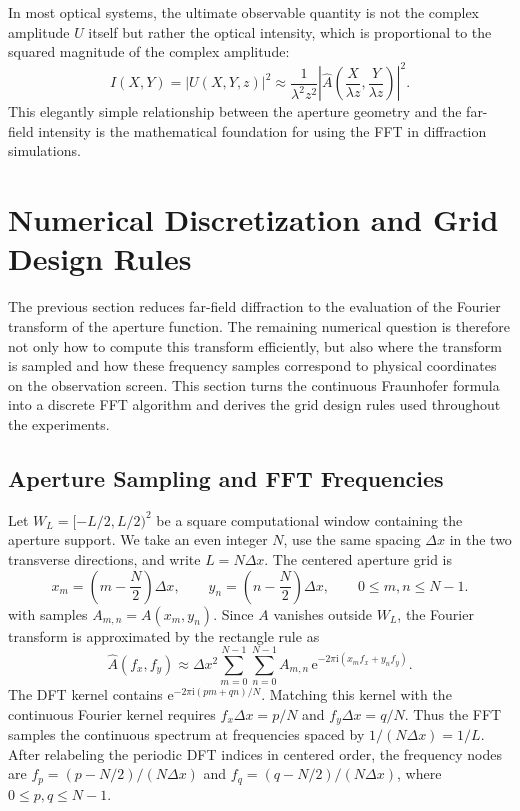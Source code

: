 \documentclass[12pt]{article}
\begin{document}
In most optical systems, the ultimate observable quantity is not the complex amplitude \( U \) itself but
rather the optical intensity, which is proportional to the squared magnitude of the complex amplitude:
\[
    I(X, Y) = |U(X, Y, z)|^2 \approx \frac{1}{\lambda^2 z^2} \left| \hat{A} \left( \frac{X}{\lambda z}, 
    \frac{Y}{\lambda z} \right) \right|^2.
\]
This elegantly simple relationship between the aperture geometry and the far-field intensity is the 
mathematical foundation for using the FFT in diffraction simulations.

\section{Numerical Discretization and Grid Design Rules}

The previous section reduces far-field diffraction to the evaluation of the Fourier transform of the
aperture function. The remaining numerical question is therefore not only how to compute this transform
efficiently, but also where the transform is sampled and how these frequency samples correspond to
physical coordinates on the observation screen. This section turns the continuous Fraunhofer formula into
a discrete FFT algorithm and derives the grid design rules used throughout the experiments.

\subsection{Aperture Sampling and FFT Frequencies}

Let \(W_L=[-L/2,L/2)^2\) be a square computational window containing the aperture support. We take an even
integer \(N\), use the same spacing \(\Delta x\) in the two transverse directions, and write \(L=N\Delta x\).
The centered aperture grid is
\[
    x_m = \left(m-\frac{N}{2}\right)\Delta x,\qquad
    y_n = \left(n-\frac{N}{2}\right)\Delta x,\qquad
    0 \leq m,n \leq N-1.
\]
with samples \(A_{m,n}=A(x_m,y_n)\). Since \(A\) vanishes outside \(W_L\), the Fourier transform is
approximated by the rectangle rule as
\[
    \hat{A}(f_x,f_y)\approx \Delta x^2
    \sum_{m=0}^{N-1}\sum_{n=0}^{N-1}
    A_{m,n}\,
    \mathrm{e}^{-2\pi\mathrm{i}(x_m f_x+y_n f_y)}.
\]
The DFT kernel contains \(\mathrm{e}^{-2\pi\mathrm{i}(pm+qn)/N}\). Matching this kernel with the continuous
Fourier kernel requires \(f_x\Delta x=p/N\) and \(f_y\Delta x=q/N\). Thus the FFT samples the continuous
spectrum at frequencies spaced by \(1/(N\Delta x)=1/L\). After relabeling the periodic DFT indices in
centered order, the frequency nodes are
\(f_p=(p-N/2)/(N\Delta x)\) and \(f_q=(q-N/2)/(N\Delta x)\), where
\(0\leq p,q\leq N-1\).
\end{document}
